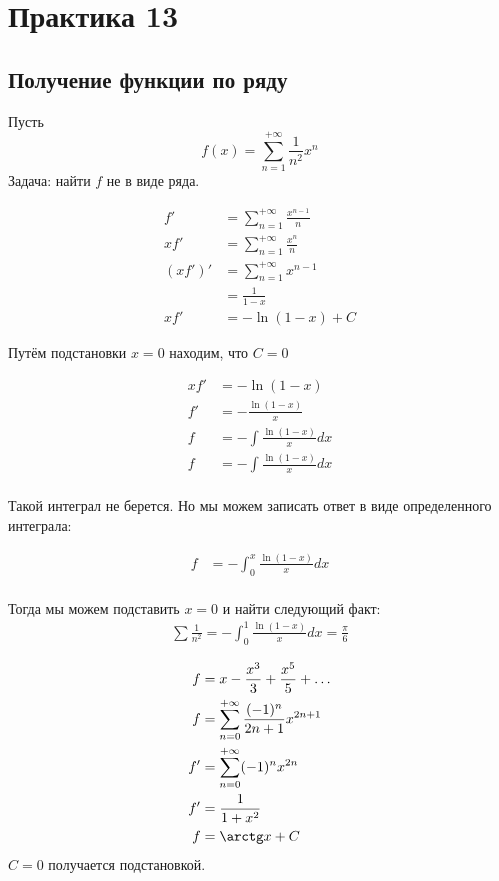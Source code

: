 \section*{Практика 13}

\subsection*{Получение функции по ряду}

Пусть \[f(x) = \sum_{n = 1}^{+\infty} \frac{1}{n^2} x^n\]Задача: найти \(f\) не в виде ряда.

\begin{align*}
    f'     & = \sum_{n = 1}^{+\infty} \frac{x^{n - 1}}{n} \\
    xf'    & = \sum_{n = 1}^{+\infty} \frac{x^n}{n}       \\
    (xf')' & = \sum_{n = 1}^{+\infty} x^{n - 1}           \\
           & = \frac{1}{1 - x}                            \\
    xf'    & = -\ln(1 - x) + C
\end{align*}

Путём подстановки \(x = 0\) находим, что \(C = 0\)

\begin{align*}
    xf' & = -\ln(1 - x)                   \\
    f'  & = -\frac{\ln(1 - x)}{x}         \\
    f   & = -\int \frac{\ln(1 - x)}{x} dx \\
    f   & = -\int \frac{\ln(1 - x)}{x} dx \\
\end{align*}

Такой интеграл не берется. Но мы можем записать ответ в виде определенного интеграла:

\begin{align*}
    f & = -\int_0^x \frac{\ln(1 - x)}{x} dx \\
\end{align*}

Тогда мы можем подставить \(x = 0\) и найти следующий факт:
\begin{align*}
    \sum \frac{1}{n^2} = -\int_0^1 \frac{\ln(1 - x)}{x} dx = \frac{\pi}{6}
\end{align*}

\begin{exercise}[2906]
    \begin{align*}
        f  & = x - \frac{x^3}{3} + \frac{x^5}{5} + \dots                 \\
        f  & = \sum_{n = 0}^{+\infty} \frac{( - 1)^n}{2n + 1} x^{2n + 1} \\
        f' & = \sum_{n = 0}^{+\infty} ( - 1)^n x^{2n}                    \\
        f' & = \frac{1}{1 + x^2}                                         \\
        f  & = \arctg x + C                                              \\
    \end{align*}
    \(C = 0\) получается подстановкой.
\end{exercise}

